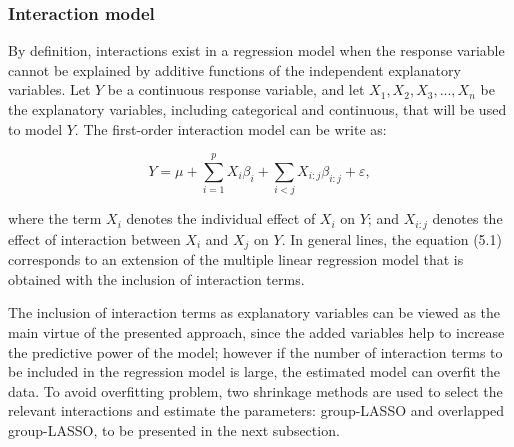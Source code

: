 \subsubsection*{Interaction model}


By definition, interactions exist in a regression model when the response variable cannot be explained by additive functions of the independent explanatory variables.
%
%
Let $Y$ be a continuous response variable, and let $X_1, X_2, X_3, ..., X_n$ be the explanatory variables, including categorical and continuous, that will be used to model $Y$. The first-order interaction model can be write as:

\begin{equation}
Y = \mu+\sum_{i=1}^{p} X_{i} \beta_{i}+\sum_{i<j} X_{i : j} \beta_{i : j} + \varepsilon,
\end{equation}

where the term $X_i$ denotes the individual effect of $X_i$ on $Y$; and $X_{i:j}$ denotes the effect of interaction between $X_i$ and $X_j$ on $Y$. In general lines, the equation (5.1) corresponds to an extension of the multiple linear regression model that is obtained with the inclusion of interaction terms.

The inclusion of interaction terms as explanatory variables can be viewed as the main virtue of the presented approach, since the added variables help to increase the predictive power of the model; however if the number of interaction terms to be included in the regression model is large, the estimated model can overfit the data. To avoid overfitting problem, two shrinkage methods are used to select the relevant interactions and estimate the parameters: group-LASSO and overlapped group-LASSO, to be presented in the next subsection.


